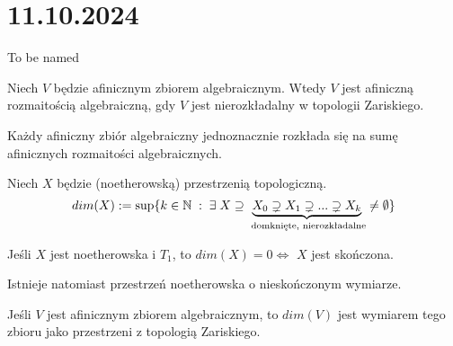 \section{11.10.2024}{To be named}

\begin{definition}{}{}
  Niech $V$ będzie afinicznym zbiorem algebraicznym. Wtedy $V$ jest afiniczną rozmaitością algebraiczną, gdy $V$ jest nierozkładalny w topologii Zariskiego.
\end{definition}

\begin{proposition}{}{}
  Każdy afiniczny zbiór algebraiczny jednoznacznie rozkłada się na sumę afinicznych rozmaitości algebraicznych.
\end{proposition}

\begin{center}
\end{center}

\begin{definition}{}{}
  Niech $X$ będzie (noetherowską) przestrzenią topologiczną. 
  $$dim(X):=\sup\{k\in\mathbb{N}\;:\;\exists\;X\supseteq \underbrace{X_0\supsetneq X_1\supsetneq...\supsetneq X_k}_\text{ domknięte, nierozkładalne}\neq\emptyset\}$$
\end{definition}

\begin{fact}{}{}
  Jeśli $X$ jest noetherowska i $T_1$, to $dim(X)=0\iff$ $X$ jest skończona.
\end{fact}

Istnieje natomiast przestrzeń noetherowska o nieskończonym wymiarze.

\begin{definition}{}{}
  Jeśli $V$ jest afinicznym zbiorem algebraicznym, to $dim(V)$ jest wymiarem tego zbioru jako przestrzeni z topologią Zariskiego.
\end{definition}

